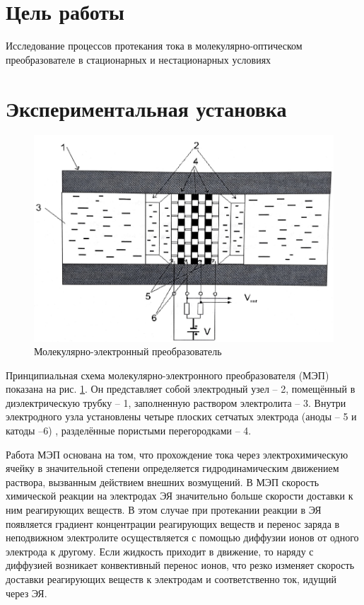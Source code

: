 \documentclass[a4paper,12pt]{article}
\begin{document}
\tableofcontents

\newpage

\section{Цель работы}
Исследование процессов протекания тока в молекулярно-оптическом преобразователе в стационарных и нестационарных условиях

\section{Экспериментальная установка}

\begin{figure}[h]
	\begin{center}
		\includegraphics[scale=1]{fig1}
		\caption{Молекулярно-электронный преобразователь}
		\label{MEP}
	\end{center}
\end{figure}


Принципиальная схема молекулярно-электронного преобразователя (МЭП) показана на рис. \ref{MEP}. Он представляет собой электродный узел -- 2, помещённый в диэлектрическую трубку -- 1, заполненную раствором электролита -- 3. Внутри электродного узла установлены четыре плоских сетчатых электрода (аноды -- 5 и катоды --6) , разделённые пористыми перегородками -- 4.

Работа МЭП основана на том, что прохождение тока через электрохимическую ячейку в значительной степени определяется гидродинамическим движением раствора, вызванным действием внешних возмущений. В МЭП скорость химической реакции на электродах ЭЯ значительно больше скорости доставки к ним реагирующих веществ. В этом случае при протекании реакции в ЭЯ появляется градиент концентрации реагирующих веществ и перенос заряда в неподвижном электролите осуществляется с помощью диффузии ионов от одного электрода к другому. Если жидкость приходит в движение, то наряду с диффузией возникает конвективный перенос ионов, что резко изменяет скорость доставки реагирующих веществ к электродам и соответственно ток, идущий через ЭЯ.
\end{document}
